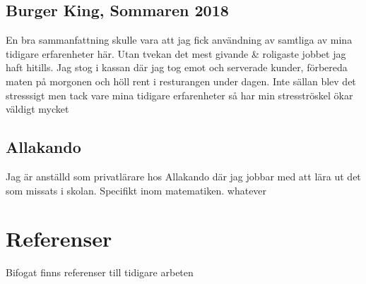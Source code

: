 \documentclass{article}
\begin{document}
\subsection{Burger King, Sommaren 2018}

    En bra sammanfattning skulle vara att jag fick användning av samtliga av mina tidigare erfarenheter här. Utan tvekan det mest givande \& roligaste jobbet jag haft hitills. Jag stog i kassan där jag tog emot och serverade kunder, förbereda maten på morgonen och höll rent i resturangen under dagen. Inte sällan blev det stresssigt men tack vare mina tidigare erfarenheter så har min stresströskel ökar väldigt mycket 

\subsection{Allakando}

    Jag är anställd som privatlärare hos Allakando där jag jobbar med att lära ut det som missats i skolan. Specifikt inom matematiken. whatever 



\section{Referenser}

    Bifogat finns referenser till tidigare arbeten
\end{document}
